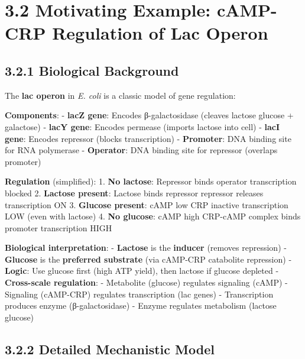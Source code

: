 \hypertarget{motivating-example-camp-crp-regulation-of-lac-operon}{%
\section{3.2 Motivating Example: cAMP-CRP Regulation of Lac
Operon}\label{motivating-example-camp-crp-regulation-of-lac-operon}}

\hypertarget{biological-background}{%
\subsection{3.2.1 Biological Background}\label{biological-background}}

The \textbf{lac operon} in \emph{E. coli} is a classic model of gene
regulation:

\textbf{Components}: - \textbf{lacZ gene}: Encodes β-galactosidase
(cleaves lactose \textrightarrow glucose + galactose) - \textbf{lacY gene}: Encodes
permease (imports lactose into cell) - \textbf{lacI gene}: Encodes
repressor (blocks transcription) - \textbf{Promoter}: DNA binding site
for RNA polymerase - \textbf{Operator}: DNA binding site for repressor
(overlaps promoter)

\textbf{Regulation} (simplified): 1. \textbf{No lactose}: Repressor
binds operator \textrightarrow transcription blocked 2. \textbf{Lactose present}:
Lactose binds repressor \textrightarrow repressor releases \textrightarrow transcription ON 3.
\textbf{Glucose present}: cAMP low \textrightarrow CRP inactive \textrightarrow transcription LOW
(even with lactose) 4. \textbf{No glucose}: cAMP high \textrightarrow CRP-cAMP complex
binds promoter \textrightarrow transcription HIGH

\textbf{Biological interpretation}: - \textbf{Lactose} is the
\textbf{inducer} (removes repression) - \textbf{Glucose} is the
\textbf{preferred substrate} (via cAMP-CRP catabolite repression) -
\textbf{Logic}: Use glucose first (high ATP yield), then lactose if
glucose depleted - \textbf{Cross-scale regulation}: - Metabolite
(glucose) regulates signaling (cAMP) - Signaling (cAMP-CRP) regulates
transcription (lac genes) - Transcription produces enzyme
(β-galactosidase) - Enzyme regulates metabolism (lactose \textrightarrow glucose)

\hypertarget{detailed-mechanistic-model}{%
\subsection{3.2.2 Detailed Mechanistic
Model}\label{detailed-mechanistic-model}}

